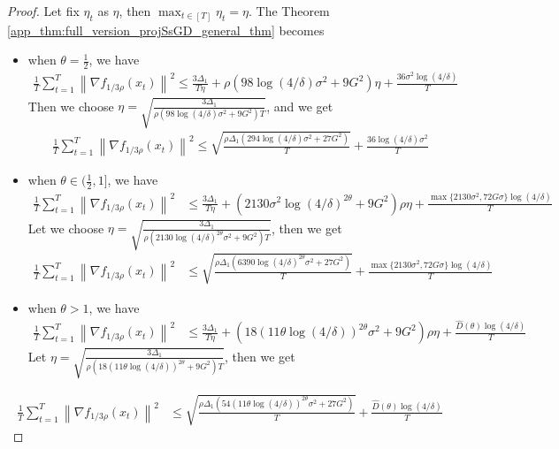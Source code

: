 \documentclass{article}
\def \sumT {\sum_{t=1}^T}
\def \nab {\nabla}
\newcommand{\norm}[2][]{\left\|#2\right\|^{#1}}
\begin{document}
\begin{proof}
    Let fix $\eta_t$ as $\eta$, then $\max_{t\in[T]}\eta_t=\eta$. The Theorem \ref{app_thm:full_version_projSsGD_general_thm} becomes

        \begin{itemize}
            \item when $\theta=\frac{1}{2}$, we have
            \begin{align}
                \frac{1}{T}\sumT \norm[2]{\nab f_{1/3\rho}(x_t)}\leq \frac{3\Delta_1}{T\eta}+\rho(98\log(4/\delta)\sigma^2+9G^2)\eta +\frac{36\sigma^2\log(4/\delta)}{T}
            \end{align}
            Then we choose $\eta=\sqrt{\frac{3\Delta_1}{\rho(98\log(4/\delta)\sigma^2+9G^2)T}}$, and we get
            \begin{align}
                \frac{1}{T}\sumT \norm[2]{\nab f_{1/3\rho}(x_t)}\leq\sqrt{\frac{\rho\Delta_1(294\log(4/\delta)\sigma^2+27G^2)}{T}}+\frac{36\log(4/\delta)\sigma^2}{T}
            \end{align}
            \item when $\theta\in(\frac{1}{2},1]$, we have
            \begin{align}
                \frac{1}{T}\sumT \norm[2]{\nab f_{1/3\rho}(x_t)} &\leq \frac{3\Delta_1}{T\eta}
                + (2130\sigma^2\log(4/\delta)^{2\theta}+9G^2)\rho\eta+ \frac{\max\{2130\sigma^2,72G\sigma\}\log(4/\delta)}{T}
            \end{align}
            Let we choose $\eta=\sqrt{\frac{3\Delta_1}{\rho(2130\log(4/\delta)^{2\theta}\sigma^2+9G^2)T}}$, then we get
            \begin{align}
                \frac{1}{T}\sumT \norm[2]{\nab f_{1/3\rho}(x_t)} &\leq \sqrt{\frac{\rho\Delta_1(6390\log(4/\delta)^{2\theta}\sigma^2+27G^2)}{T}}+\frac{\max\{2130\sigma^2,72G\sigma\}\log(4/\delta)}{T}
            \end{align}
            \item when $\theta>1$, we have
            \begin{align}
                \frac{1}{T}\sumT \norm[2]{\nab f_{1/3\rho}(x_t)}&\leq \frac{3\Delta_1}{T\eta}+(18(11\theta\log(4/\delta))^{2\theta}\sigma^2+9G^2)\rho\eta+\frac{\widehat{D}(\theta)\log(4/\delta)}{T}
            \end{align}
            Let $\eta = \sqrt{\frac{3\Delta_1}{\rho(18(11\theta\log(4/\delta))^{2\theta}+9G^2)T}}$, then we get
        \end{itemize}
        \begin{align}
            \frac{1}{T}\sumT \norm[2]{\nab f_{1/3\rho}(x_t)}&\leq \sqrt{\frac{\rho\Delta_1(54(11\theta\log(4/\delta))^{2\theta}\sigma^2+27G^2)}{T}}+\frac{\widehat{D}(\theta)\log(4/\delta)}{T}
        \end{align}
\end{proof}
\end{document}
